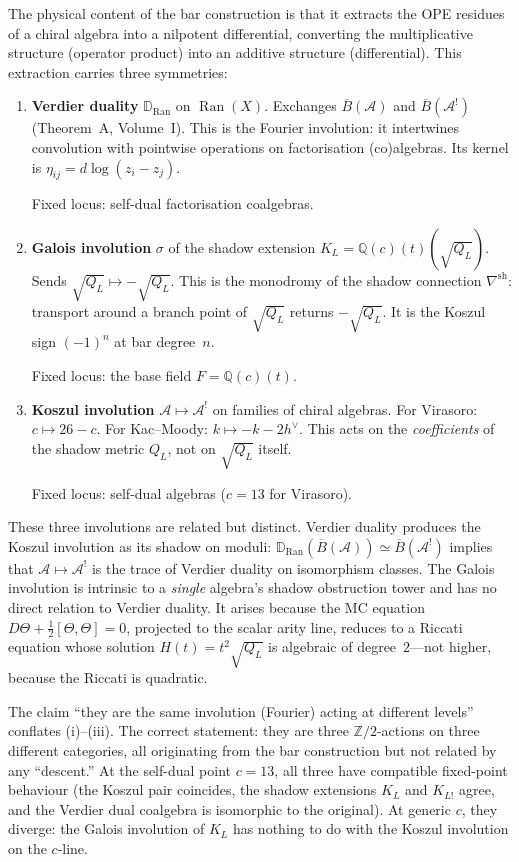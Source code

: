 \documentclass[11pt]{article}
\newcommand{\cA}{\mathcal{A}}
\newcommand{\barB}{\overline{B}}
\newcommand{\Z}{\mathbb{Z}}
\newcommand{\Q}{\mathbb{Q}}
\newcommand{\bD}{\mathbb{D}}
\newcommand{\Ran}{\operatorname{Ran}}
\begin{document}
The physical content of the bar construction is that it extracts
the OPE residues of a chiral algebra into a nilpotent differential,
converting the multiplicative structure (operator product) into an
additive structure (differential).  This extraction carries three
symmetries:

\begin{enumerate}[label=\textup{(\roman*)}]
\item \textbf{Verdier duality} $\bD_{\Ran}$ on $\Ran(X)$.
  Exchanges $\barB(\cA)$ and $\barB(\cA^!)$ (Theorem~A,
  Volume~I).  This is the Fourier involution: it intertwines
  convolution with pointwise operations on factorisation
  (co)algebras.  Its kernel is $\eta_{ij} = d\log(z_i - z_j)$.

  Fixed locus: self-dual factorisation coalgebras.

\item \textbf{Galois involution} $\sigma$ of the shadow
  extension $K_L = \Q(c)(t)(\sqrt{Q_L})$.  Sends
  $\sqrt{Q_L} \mapsto -\sqrt{Q_L}$.  This is the monodromy
  of the shadow connection $\nabla^{\mathrm{sh}}$: transport
  around a branch point of $\sqrt{Q_L}$ returns $-\sqrt{Q_L}$.
  It is the Koszul sign $(-1)^n$ at bar degree~$n$.

  Fixed locus: the base field $F = \Q(c)(t)$.

\item \textbf{Koszul involution} $\cA \mapsto \cA^!$ on
  families of chiral algebras.  For Virasoro: $c \mapsto 26 - c$.
  For Kac--Moody: $k \mapsto -k - 2h^\vee$.  This acts on the
  \emph{coefficients} of the shadow metric $Q_L$, not on
  $\sqrt{Q_L}$ itself.

  Fixed locus: self-dual algebras ($c = 13$ for Virasoro).
\end{enumerate}

These three involutions are related but distinct.  Verdier
duality produces the Koszul involution as its shadow on moduli:
$\bD_{\Ran}(\barB(\cA)) \simeq \barB(\cA^!)$ implies that
$\cA \mapsto \cA^!$ is the trace of Verdier duality on isomorphism
classes.  The Galois involution is intrinsic to a \emph{single}
algebra's shadow obstruction tower and has no direct relation to Verdier
duality.  It arises because the MC equation
$D\Theta + \tfrac{1}{2}[\Theta, \Theta] = 0$, projected to the
scalar arity line, reduces to a Riccati equation whose solution
$H(t) = t^2\sqrt{Q_L}$ is algebraic of degree~$2$---not higher,
because the Riccati is quadratic.

The claim ``they are the same involution (Fourier) acting at
different levels'' conflates (i)--(iii).  The correct statement:
they are three $\Z/2$-actions on three different categories, all
originating from the bar construction but not related by any
``descent.''  At the self-dual point $c = 13$, all three have
compatible fixed-point behaviour (the Koszul pair coincides, the
shadow extensions $K_L$ and $K_{L!}$ agree, and the Verdier dual
coalgebra is isomorphic to the original).  At generic $c$, they
diverge: the Galois involution of $K_L$ has nothing to do with
the Koszul involution on the $c$-line.
\end{document}
